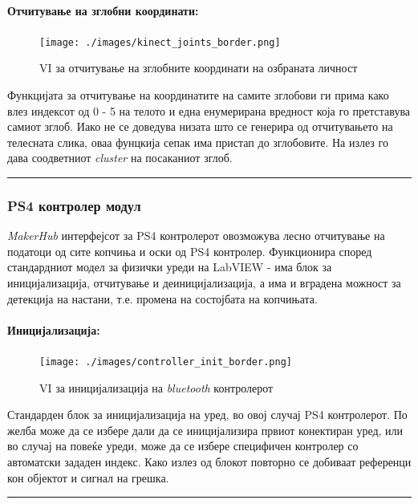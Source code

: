 \documentclass[11pt]{article}
\begin{document}
      \paragraph{Отчитување на зглобни координати:\\}
	      \begin{figure}[H]
          \centering
	        \texttt{[image: ./images/kinect\_joints\_border.png]}
	        \caption{VI за отчитување на зглобните координати на озбраната личност}
	        \label{fig:kinect_joints.png}
	        \end{figure}
        Функцијата за отчитување на координатите на самите зглобови ги прима како влез индексот од 0 - 5 на телото и една енумерирана вредност која го претставува самиот зглоб. Иако не се доведува низата што се генерира од отчитувањето на телесната слика, оваа фунцкија сепак има пристап до зглобовите. На излез го дава соодветниот \textit{cluster} на посаканиот зглоб.\\
        \textcolor[RGB]{150,150,150}{\rule{\linewidth}{1.6pt}}

    \subsubsection{PS4 контролер модул}
      \textit{MakerHub} интерфејсот за PS4 контролерот овозможува лесно отчитување на податоци од сите копчиња и оски од PS4 контролер. Функционира според стандардниот модел за физички уреди на LabVIEW - има блок за иницијализација, отчитување и деиницијализација, а има и вградена можност за детекција на настани, т.е. промена на состојбата на копчињата.

      \paragraph{Иницијализација:\\}
	      \begin{figure}[H]
          \centering
	        \texttt{[image: ./images/controller\_init\_border.png]}
		      \caption{VI за иницијализација на \textit{bluetooth} контролерот}
	        \label{fig:controller_init.png}
	        \end{figure}
        Стандарден блок за иницијализација на уред, во овој случај PS4 контролерот. По желба може да се избере дали да се иницијализира првиот конектиран уред, или во случај на повеќе уреди, може да се избере специфичен контролер со автоматски зададен индекс. Како излез од блокот повторно се добиваат референци кон објектот и сигнал на грешка.\\
        \textcolor[RGB]{150,150,150}{\rule{\linewidth}{1.6pt}}
\end{document}
